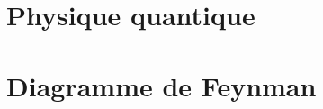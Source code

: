 \chapter{Physique quantique}
%

%

%
\chapter{Diagramme de Feynman}
%

%

%

%

%
%
%
%
%
%
%
%
%
%
%
%
%
